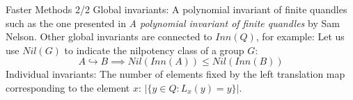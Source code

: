 \begin{frame}{Faster Methods 2/2}
\normalsize
Global invariants:\newline
A polynomial invariant of finite quandles such as the one presented in \textit{A polynomial invariant of finite quandles} by Sam Nelson.\newline\newline
Other global invariants are connected to $Inn(Q)$, for example: \newline\newline
Let us use $Nil(G)$ to indicate the nilpotency class of a group $G$:
\[A \hookrightarrow B \implies Nil(Inn(A)) \leq Nil(Inn(B)) \]
    Individual invariants:\newline
    The number of elements fixed by the left translation map corresponding to the element $x$: $|\{y \in Q : L_x(y) = y \}|$.
\end{frame}

